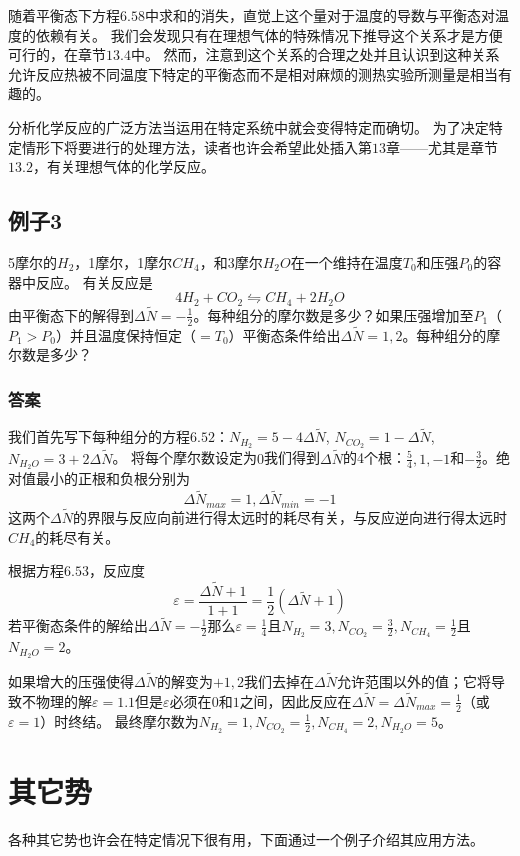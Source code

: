随着平衡态下方程$6.58$中求和的消失，直觉上这个量对于温度的导数与平衡态对温度的依赖有关。
我们会发现只有在理想气体的特殊情况下推导这个关系才是方便可行的，在章节$13.4$中。
然而，注意到这个关系的合理之处并且认识到这种关系允许反应热被不同温度下特定的平衡态而不是相对麻烦的测热实验所测量是相当有趣的。

分析化学反应的广泛方法当运用在特定系统中就会变得特定而确切。
为了决定特定情形下将要进行的处理方法，读者也许会希望此处插入第$13$章——尤其是章节$13.2$，有关理想气体的化学反应。

\subsection*{例子3}
5摩尔的$H_2$，1摩尔，1摩尔$CH_4$，和3摩尔$H_2O$在一个维持在温度$T_0$和压强$P_0$的容器中反应。
有关反应是
\[ 4H_2+CO_2\leftrightharpoons CH_4+2H_2O \]
由平衡态下的解得到$\Delta \tilde{N}=-\frac{1}{2}$。每种组分的摩尔数是多少？如果压强增加至$P_1$（$P_1>P_0$）并且温度保持恒定（$=T_0$）平衡态条件给出$\Delta \tilde{N}=1, 2$。每种组分的摩尔数是多少？
\subsubsection*{答案}
我们首先写下每种组分的方程$6.52$：$N_{H_2}=5-4\Delta \tilde{N}$, $N_{CO_2}=1-\Delta \tilde{N}$, $N_{H_2O}=3+2\Delta \tilde{N}$。
将每个摩尔数设定为$0$我们得到$\Delta \tilde{N}$的4个根：$\frac{5}{4}, 1, -1$和$-\frac{3}{2}$。绝对值最小的正根和负根分别为
\[ \Delta \tilde{N}_{max}=1, \Delta \tilde{N}_{min}=-1 \]
这两个$\Delta \tilde{N}$的界限与反应向前进行得太远时的耗尽有关，与反应逆向进行得太远时$CH_4$的耗尽有关。

根据方程$6.53$，反应度
\[ \varepsilon=\frac{\Delta \tilde{N}+1}{1+1}=\frac{1}{2}(\Delta \tilde{N}+1) \]
若平衡态条件的解给出$\Delta \tilde{N}=-\frac{1}{2}$那么$\varepsilon=\frac{1}{4}$且$N_{H_2}=3, N_{CO_2}=\frac{3}{2}, N_{CH_4}=\frac{1}{2}$且$N_{H_2O}=2$。

如果增大的压强使得$\Delta \tilde{N}$的解变为$+1, 2$我们去掉在$\Delta \tilde{N}$允许范围以外的值；它将导致不物理的解$\varepsilon=1.1$但是$\varepsilon$必须在$0$和$1$之间，因此反应在$\Delta \tilde{N}=\Delta \tilde{N}_{max}=\frac{1}{2}$（或$\varepsilon=1$）时终结。
最终摩尔数为$N_{H_2}=1, N_{CO_2}=\frac{1}{2}, N_{CH_4}=2, N_{H_2O}=5$。


\section{其它势}
\label{sec6.5}
各种其它势也许会在特定情况下很有用，下面通过一个例子介绍其应用方法。


